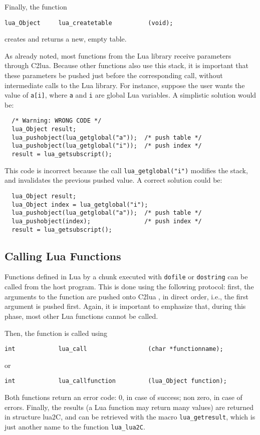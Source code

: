 Finally, the function
\begin{verbatim}
lua_Object     lua_createtable          (void);
\end{verbatim}
creates and returns a new, empty table.

As already noted,
most functions from the Lua library receive parameters through C2lua.
Because other functions also use this stack,
it is important that these
parameters be pushed just before the corresponding call,
without intermediate calls to the Lua library.
For instance, suppose the user wants the value of \verb'a[i]',
where \verb'a' and \verb'i' are global Lua variables.
A simplistic solution would be:
\begin{verbatim}
  /* Warning: WRONG CODE */
  lua_Object result;
  lua_pushobject(lua_getglobal("a"));  /* push table */
  lua_pushobject(lua_getglobal("i"));  /* push index */
  result = lua_getsubscript();
\end{verbatim}
This code is incorrect because
the call \verb'lua_getglobal("i")' modifies the stack,
and invalidates the previous pushed value.
A correct solution could be:
\begin{verbatim}
  lua_Object result;
  lua_Object index = lua_getglobal("i");
  lua_pushobject(lua_getglobal("a"));  /* push table */
  lua_pushobject(index);               /* push index */
  result = lua_getsubscript();
\end{verbatim}

\subsection{Calling Lua Functions}
Functions defined in Lua by a chunk executed with
\verb'dofile' or \verb'dostring' can be called from the host program.
This is done using the following protocol:
first, the arguments to the function are pushed onto C2lua
, in direct order, i.e., the first argument is pushed first.
Again, it is important to emphasize that, during this phase,
most other Lua functions cannot be called.

Then, the function is called using
\begin{verbatim}
int            lua_call                 (char *functionname);
\end{verbatim}
or
\begin{verbatim}
int            lua_callfunction         (lua_Object function);
\end{verbatim}
Both functions return an error code:
0, in case of success; non zero, in case of errors.
Finally, the results (a Lua function may return many values)
are returned in structure lua2C,
and can be retrieved with the macro \verb|lua_getresult|,
which is just another name to the function \verb|lua_lua2C|.

